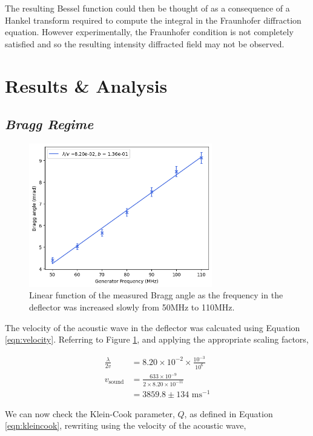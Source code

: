 \documentclass[aps,prl,reprint,10pt,amsmath,amssymb,superscriptaddress,a4paper]{revtex4-2}
\begin{document}
The resulting Bessel function could then be thought of as a consequence of a Hankel transform required to compute the integral in the Fraunhofer diffraction equation. However 
experimentally, the Fraunhofer condition is not completely satisfied and so the resulting intensity diffracted field may not be observed.

\section{Results \& Analysis}
\subsection{\normalfont\textit{Bragg Regime}}

\begin{figure}
    \includegraphics[width = 8cm]{../Figures/velocity.png}
    \caption{Linear function of the measured Bragg angle as the frequency in the deflector was increased 
    slowly from 50MHz to 110MHz.}
    \label{fig:velocity}
\end{figure}

The velocity of the acoustic wave in the deflector was calcuated using Equation \ref{eqn:velocity}. Referring to Figure \ref{fig:velocity}, and applying the appropriate scaling factors,

\begin{align*}
    \frac{\lambda}{2v} &= 8.20 \times 10^{-2} \times \frac{10^{-3}}{10^{6}} \\
    v_{\text{sound}} &= \frac{633 \times 10^{-9}}{2\times8.20 \times 10^{-11}} \\
    &= 3859.8 \pm 134\text{ ms}^{-1}
\end{align*}

We can now check the Klein-Cook parameter, $Q$, as defined in Equation \ref{eqn:kleincook}, rewriting using the velocity of the acoustic wave,
\end{document}
